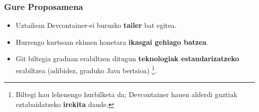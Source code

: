 \documentclass[lang=eu,biz=pls,aspectratio=169,handout]{mupresentation}
\begin{document}
\begin{frame}
  \frametitle{Gure Proposamena}
  \begin{itemize}
    \item Uztailean Devcontainer-ei buruzko \textbf{tailer} bat egitea.
    \item Hurrengo kurtsoan ekimen honetara \textbf{ikasgai gehiago batzea}.
    \item Git biltegia graduan erabiltzen ditugun \textbf{teknologiak estandarizatzeko} erabiltzea (adibidez, graduko Java bertsioa) \footnote{Biltegi hau lehenengo hurbilketa da; Devcontainer hauen alderdi guztiak eztabaidatzeko \textbf{irekita} daude.}.
  \end{itemize}
\end{frame}

\end{document}
